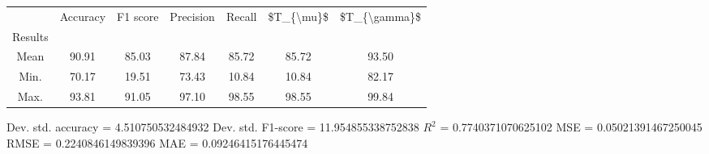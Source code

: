 \begin{tabular}{|c|c|c|c|c|c|c|}
\toprule
{} &  Accuracy &  F1 score &  Precision &  Recall &  \$T\_\{\textbackslash mu\}\$ &  \$T\_\{\textbackslash gamma\}\$ \\
Results &           &           &            &         &            &               \\
\hline
Mean    &     90.91 &     85.03 &      87.84 &   85.72 &      85.72 &         93.50 \\
Min.    &     70.17 &     19.51 &      73.43 &   10.84 &      10.84 &         82.17 \\
Max.    &     93.81 &     91.05 &      97.10 &   98.55 &      98.55 &         99.84 \\
\bottomrule
\end{tabular}

 Dev. std. accuracy = 4.510750532484932
 Dev. std. F1-score = 11.954855338752838
 $R^2$ = 0.7740371070625102
 MSE = 0.05021391467250045
 RMSE = 0.2240846149839396
 MAE = 0.09246415176445474